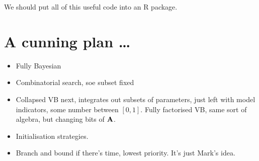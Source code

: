 \documentclass{amsart}
\begin{document}
We should put all of this useful code into an R package.

\section{A cunning plan \ldots}
\begin{itemize}
\item Fully Bayesian
\item Combinatorial search, soe subset fixed
\item Collapsed VB next, integrates out subsets of parameters, just left with model indicators, some number 
			between $[0, 1]$. Fully factorised VB, same sort of algebra, but changing bits of ${\bf A}$.
\item Initialisation strategies.
\item Branch and bound if there's time, lowest priority. It's just Mark's idea.
\end{itemize}
\end{document}
